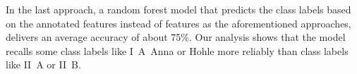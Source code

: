 \bigskip
In the last approach, a random forest model that predicts the class labels based on the annotated features instead of features as the aforementioned approaches, delivers an average accuracy of about 75\%. Our analysis shows that the model recalls some class labels like I~A~Anna or Hohle more reliably than class labels like II~A or II~B.